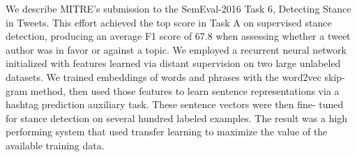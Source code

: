 We describe MITRE's submission to the SemEval-2016 Task 6, Detecting Stance in Tweets. This effort achieved the top score in Task A on supervised stance detection, producing an average F1 score of 67.8 when assessing whether a tweet author was in favor or against a topic. We employed a recurrent neural network initialized with features learned via distant supervision on two large unlabeled datasets. We trained embeddings of words and phrases with the word2vec skip-gram method, then used those features to learn sentence representations via a hashtag prediction auxiliary task. These sentence vectors were then fine- tuned for stance detection on several hundred labeled examples. The result was a high performing system that used transfer learning to maximize the value of the available training data.
